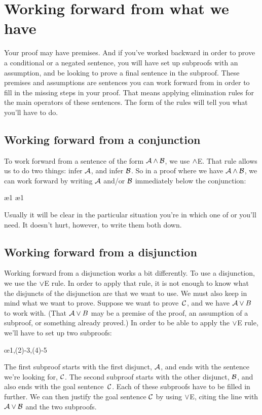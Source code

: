 \section{Working forward from what we have}

Your proof may have premises. And if you've worked backward in order to prove a conditional or a negated sentence, you will have set up subproofs with an assumption, and be looking to prove a final sentence in the subproof. These premises and assumptions are sentences you can work forward from in order to fill in the missing steps in your proof. That means applying elimination rules for the main operators of these sentences. The form of the rules will tell you what you'll have to do.

\subsection*{Working forward from a conjunction}

To work forward from a sentence of the form $\mathcal{A} \wedge \mathcal{B}$, we use $\wedge$E. That rule allows us to do two things: infer $\mathcal{A}$, and infer $\mathcal{B}$. So in a proof where we have $\mathcal{A} \wedge \mathcal{B}$, we can work forward by writing $\mathcal{A}$ and/or $\mathcal{B}$ immediately below the conjunction:
\begin{fitchproof}
  \ae{1}
  \ae{1}
\end{fitchproof}
Usually it will be clear in the particular situation you're in which one of  or  you'll need. It doesn't hurt, however, to write them both down.

\subsection*{Working forward from a disjunction}

Working forward from a disjunction works a bit differently. To use a disjunction, we use the $\vee$E rule. In order to apply that rule, it is not enough to know what the disjuncts of the disjunction are that we want to use. We must also keep in mind what we want to prove. Suppose we want to prove~$\mathcal{C}$, and we have $\mathcal{A} \vee B$ to work with. (That $\mathcal{A} \vee B$ may be a premise of the proof, an assumption of a subproof, or something already proved.) In order to be able to apply the $\vee$E rule, we'll have to set up two subproofs:
\begin{fitchproof}
	\open
	\ellipsesline 
	\close 
	\open
	\ellipsesline
	\close
	\oe{1,(2)-3,(4)-5} 
\end{fitchproof} 
The first subproof starts with the first disjunct, $\mathcal{A}$, and ends with the sentence we're looking for, $\mathcal{C}$. The second subproof starts with the other disjunct, $\mathcal{B}$, and also ends with the goal sentence~$\mathcal{C}$. Each of these subproofs have to be filled in further. We can then justify the goal sentence $\mathcal{C}$ by using $\vee$E, citing the line with $\mathcal{A} \vee \mathcal{B}$ and the two subproofs.

